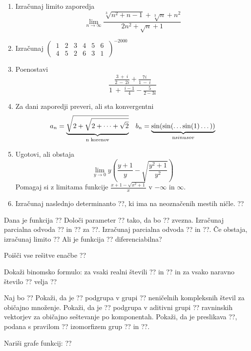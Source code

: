 \documentclass[a4paper,12pt]{article}
\begin{document}
\begin{enumerate}
    \item {
        Izračunaj limito zaporedja
        \[
            \lim_{n \rightarrow \infty} \frac{\sqrt[3]{n^2 + n - 1} + \sqrt[3]{n} + n^2}{2n^2 + \sqrt{n} + 1}
        \]
    }

    \item {
        Izračunaj $\left(\ \begin{matrix}
            1 & 2 & 3 & 4 & 5 & 6 \\
            4 & 5 & 2 & 6 & 3 & 1
        \end{matrix}\ \right)^{-2000}$
    }

    \item {
        Poenostavi
        \[
            \frac{
                \frac{3\ +\ i}{2\ -\ 2i} + \frac{7i}{1\ -\ i}
            }{
                1\ +\ \frac{i - 1}{4} - \frac{5}{2 - 3i}
            }
        \]
    }

    \item {
        Za dani zaporedji preveri, ali sta konvergentni
        \begin{align}
            a_n = \underbrace{\sqrt{2 + \sqrt{2 + \cdots + \sqrt{2}}}}_{\text{n korenov}} && b_n=\underbrace{\sin(\sin(\dots\sin(1)\dots))}_{\text n sinusov} \nonumber
        \end{align}
    }


    \item {
        Ugotovi, ali obstaja
        \[
            \lim_{y \rightarrow 0} y\left(\frac{y + 1}{y} - \sqrt{\frac{y^2 + 1}{y^2}}\right)
        \]
        Pomagaj si z limitama funkcije $\frac{x + 1 - \sqrt{x^2 + 1}}{x}$ v $-\infty$ in $\infty$.
    }

    \item {
        Izračunaj naslednjo determinanto ??, ki ima na neoznačenih mestih ničle.
        ??
    }
\end{enumerate} 






Dana je funkcija
??
Določi parameter ?? tako, da bo ?? zvezna.
Izračunaj parcialna odvoda ?? in ?? za ??.
Izračunaj parcialna odvoda ?? in ??.
Če obstaja, izračunaj limito
??
Ali je funkcija ?? diferenciabilna?

Poišči vse rešitve enačbe
??

Dokaži binomsko formulo: za vsaki realni števili ?? in ?? in za vsako naravno število ?? velja
??

Naj bo
??
Pokaži, da je ?? podgrupa v grupi ??
neničelnih kompleksnih števil za običajno množenje.
Pokaži, da je ?? podgrupa v aditivni grupi ??
ravninskih vektorjev za običajno seštevanje po komponentah.
Pokaži, da je preslikava ??, podana s pravilom
??
izomorfizem grup ?? in ??.

Nariši grafe funkcij:
??
\end{document}
